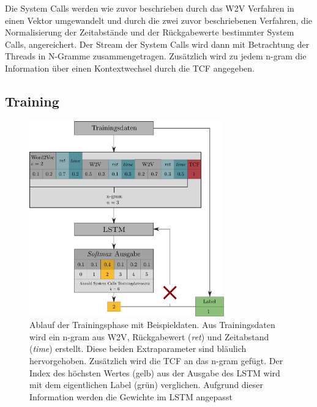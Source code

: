             Die System Calls werden wie zuvor beschrieben durch das \ac{W2V} Verfahren in einen Vektor umgewandelt und durch die zwei zuvor beschriebenen Verfahren, die Normalisierung der Zeitabstände und der Rückgabewerte bestimmter System Calls, angereichert.
            Der Stream der System Calls wird dann mit Betrachtung der Threads in N-Gramme zusammengetragen.
            Zusätzlich wird zu jedem n-gram die Information über einen Kontextwechsel durch die \ac{TCF} angegeben.

        \subsection{Training}\label{sec:Training}
            \begin{figure}
                \centering
                \includegraphics[width=0.75\textwidth]{images/Process_overview.pdf}
                \caption[Algorithmus - Ablauf Trainingsphase]{Ablauf der Trainingsphase mit Beispieldaten.
                        Aus Trainingsdaten wird ein n-gram aus \ac{W2V}, Rückgabewert (\textit{ret}) und Zeitabstand (\textit{time}) erstellt.
                        Diese beiden Extraparameter sind bläulich hervorgehoben.
                        Zusätzlich wird die \ac{TCF} an das n-gram gefügt.
                        Der Index des höchsten Wertes (gelb) aus der Ausgabe des \ac{LSTM} wird mit dem eigentlichen Label (grün) verglichen.
                        Aufgrund dieser Information werden die Gewichte im \ac{LSTM} angepasst}\label{fig:training}
            \end{figure}
